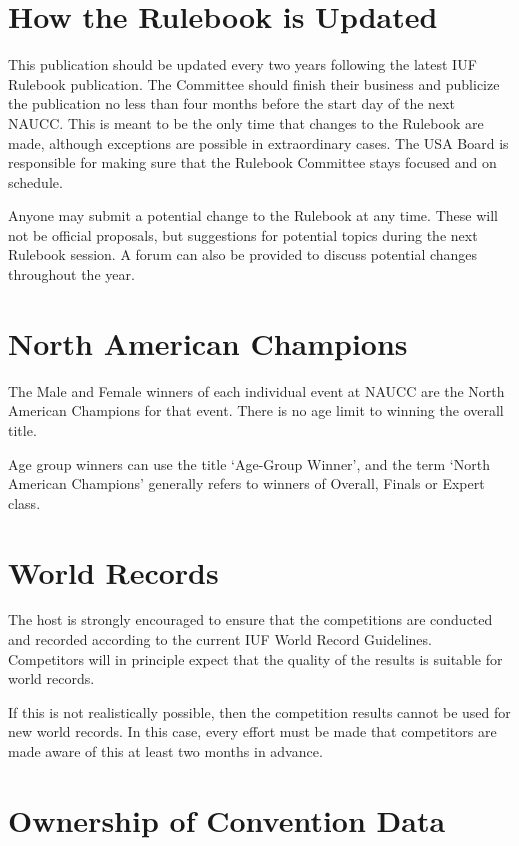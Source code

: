 \section{How the Rulebook is Updated}
This publication should be updated every two years following the latest IUF Rulebook publication.
The Committee should finish their business and publicize the publication no less than four months before the start day of the next NAUCC.
This is meant to be the only time that changes to the Rulebook are made, although exceptions are possible in extraordinary cases.
The USA Board is responsible for making sure that the Rulebook Committee stays focused and on schedule.

Anyone may submit a potential change to the Rulebook at any time.
These will not be official proposals, but suggestions for potential topics during the next Rulebook session.
A forum can also be provided to discuss potential changes throughout the year.

\section{North American Champions}
The Male and Female winners of each individual event at NAUCC are the North American Champions for that event.
There is no age limit to winning the overall title.

Age group winners can use the title `Age-Group Winner', and the term `North American Champions' generally refers to winners of Overall, Finals or Expert class.

\section{World Records}

The host is strongly encouraged to ensure that the competitions are conducted and recorded according to the current IUF World Record Guidelines.
Competitors will in principle expect that the quality of the results is suitable for world records.

If this is not realistically possible, then the competition results cannot be used for new world records.
In this case, every effort must be made that competitors are made aware of this at least two months in advance.

\section{Ownership of Convention Data}

